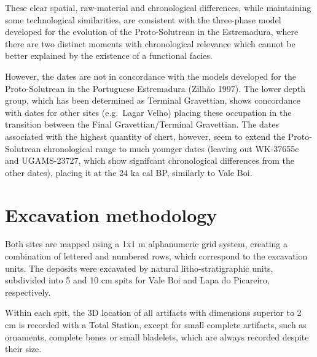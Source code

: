 \documentclass[12pt,twoside]{reedthesis}
\begin{document}
These clear spatial, raw-material and chronological differences, while maintaining some technological similarities, are consistent with the three-phase model developed for the evolution of the Proto-Solutrean in the Estremadura, where there are two distinct moments with chronological relevance which cannot be better explained by the existence of a functional facies.

However, the dates are not in concordance with the models developed for the Proto-Solutrean in the Portuguese Estremadura (Zilhão 1997). The lower depth group, which has been determined as Terminal Gravettian, shows concordance with dates for other sites (e.g.~Lagar Velho) placing these occupation in the transition between the Final Gravettian/Terminal Gravettian. The dates associated with the highest quantity of chert, however, seem to extend the Proto-Solutrean chronological range to much younger dates (leaving out WK-37655c and UGAMS-23727, which show signifcant chronological differences from the other dates), placing it at the 24 ka cal BP, similarly to Vale Boi.

\hypertarget{excavation-methodology}{%
\chapter{Excavation methodology}\label{excavation-methodology}}

Both sites are mapped using a 1x1 m alphanumeric grid system, creating a combination of lettered and numbered rows, which correspond to the excavation units. The deposits were excavated by natural litho-stratigraphic units, subdivided into 5 and 10 cm spits for Vale Boi and Lapa do Picareiro, respectively.

Within each spit, the 3D location of all artifacts with dimensions superior to 2 cm is recorded with a Total Station, except for small complete artifacts, such as ornaments, complete bones or small bladelets, which are always recorded despite their size.
\end{document}
